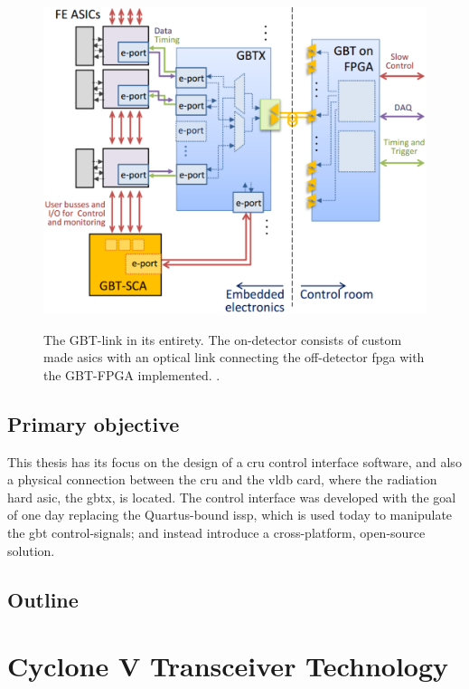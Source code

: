 \documentclass[main.tex]{subfiles}
\begin{document}
\begin{figure} %
\includegraphics[width=0.7\linewidth]{../img/gbtsys}  \\[0.1 cm]
\caption{The GBT-link in its entirety. The on-detector consists of custom made \glspl{asic} with an optical link connecting the off-detector \gls{fpga} with the GBT-FPGA implemented. \cite[Figure 1]{gbtscapres14}.}
\label{fig:gbtsys}
\end{figure}

\section{Primary objective}
This thesis has its focus on the design of a \gls{cru} control interface software, and also a physical connection between the \gls{cru} and the \gls{vldb} card, where the radiation hard \gls{asic}, the \gls{gbt}x, is located. The control interface was developed with the goal of one day replacing the Quartus-bound \gls{issp}, which is used today to manipulate the \gls{gbt} control-signals; and instead introduce a cross-platform, open-source solution. 

\section{Outline}


\chapter{Cyclone V Transceiver Technology}
\end{document}
